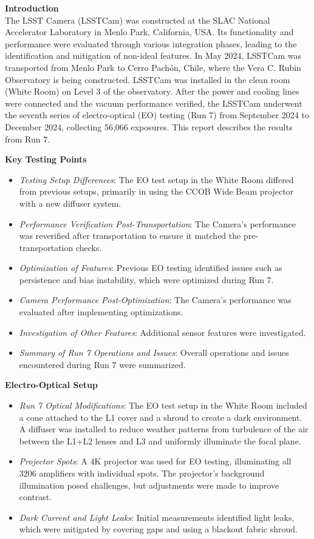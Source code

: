 \textbf{Introduction} \\
The LSST Camera (LSSTCam) was constructed at the SLAC National Accelerator Laboratory in Menlo Park, California, USA. Its functionality and performance were evaluated through various integration phases, leading to the identification and mitigation of non-ideal features.
In May 2024, LSSTCam was transported from Menlo Park to Cerro Pachón, Chile, where the Vera C. Rubin Observatory is being constructed. LSSTCam was installed in the clean room (White Room) on Level 3 of the observatory. After the power and cooling lines were connected and the vacuum performance verified, the LSSTCam underwent the seventh series of electro-optical (EO) testing (Run 7) from September 2024 to December 2024, collecting 56,066 exposures. This report describes the results from Run 7.

\textbf{Key Testing Points} \\
\begin{itemize}
    \item \textit{Testing Setup Differences}: The EO test setup in the White Room differed from previous setups, primarily in using the CCOB Wide Beam projector with a new diffuser system.
    \item \textit{Performance Verification Post-Transportation}: The Camera's performance was reverified after transportation to ensure it matched the pre-transportation checks.
    \item \textit{Optimization of Features}: Previous EO testing identified issues such as persistence and bias instability, which were optimized during Run 7.
    \item \textit{Camera Performance Post-Optimization}: The Camera's performance was evaluated after implementing optimizations.
    \item \textit{Investigation of Other Features}: Additional sensor features were investigated.
    \item \textit{Summary of Run 7 Operations and Issues}: Overall operations and issues encountered during Run 7 were summarized.
\end{itemize}

\textbf{Electro-Optical Setup} \\
\begin{itemize}
    \item \textit{Run 7 Optical Modifications}: The EO test setup in the White Room included a cone attached to the L1 cover and a shroud to create a dark environment. A diffuser was installed to reduce weather patterns from turbulence of the air between the L1+L2 lenses and L3 and uniformly illuminate the focal plane.
    \item \textit{Projector Spots}: A 4K projector was used for EO testing, illuminating all 3206 amplifiers with individual spots. The projector's background illumination posed challenges, but adjustments were made to improve contrast.
    \item \textit{Dark Current and Light Leaks}: Initial measurements identified light leaks, which were mitigated by covering gaps and using a blackout fabric shroud.
\end{itemize}

